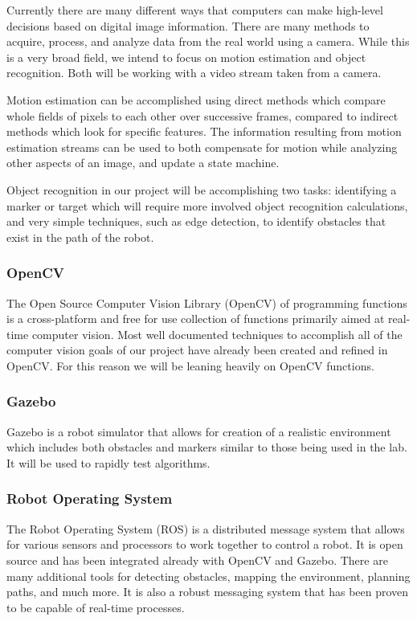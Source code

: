 \documentclass{article}
\begin{document}
		Currently there are many different ways that computers can make high-level decisions based on digital image information. There are many methods to acquire, process, and analyze data from the real world using a camera. While this is a very broad field, we intend to focus on motion estimation and object recognition. Both will be working with a video stream taken from a camera. 
		
		Motion estimation can be accomplished using direct methods which compare whole fields of pixels to each other over successive frames, compared to indirect methods which look for specific features. The information resulting from motion estimation streams can be used to both compensate for motion while analyzing other aspects of an image, and update a state machine.
		
		Object recognition in our project will be accomplishing two tasks: identifying a marker or target which will require more involved object recognition calculations, and very simple techniques, such as edge detection, to identify obstacles that exist in the path of the robot.
		
		\subsubsection{OpenCV}
		
		The Open Source Computer Vision Library (OpenCV) of programming functions is a cross-platform and free for use collection of functions primarily aimed at real-time computer vision\cite{opencv}. Most well documented techniques to accomplish all of the computer vision goals of our project have already been created and refined in OpenCV. For this reason we will be leaning heavily on OpenCV functions.
		
		\subsubsection{Gazebo}
		
		Gazebo is a robot simulator that allows for creation of a realistic environment which includes both obstacles and markers similar to those being used in the lab. It will be used to rapidly test algorithms.
		
		\subsubsection{Robot Operating System}
		
		The Robot Operating System (ROS) is a distributed message system that allows for various sensors and processors to work together to control a robot. It is open source and has been integrated already with OpenCV and Gazebo. There are many additional tools for detecting obstacles, mapping the environment, planning paths, and much more. It is also a robust messaging system that has been proven to be capable of real-time processes.
		
\end{document}
